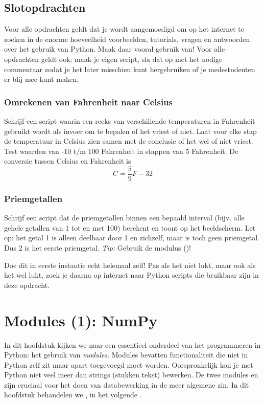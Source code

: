 \documentclass[a4paper,11pt, fleqn]{article}
\newcommand{\ditwc}{Naam van het huidige werkcollege}
\begin{document}
\subsection{Slotopdrachten}
Voor alle opdrachten geldt dat je wordt aangemoedigd om op het internet te zoeken in de enorme hoeveelheid voorbeelden, tutorials, vragen en antwoorden over het gebruik van Python. Maak daar vooral gebruik van! Voor alle opdrachten geldt ook: maak je eigen script, sla dat op met het nodige commentaar zodat je het later misschien kunt hergebruiken of je medestudenten er blij mee kunt maken.

\subsubsection{Omrekenen van Fahrenheit naar Celsius}
Schrijf een script waarin een reeks van verschillende temperaturen in Fahrenheit gebruikt wordt als invoer om te bepalen of het vriest of niet. Laat voor elke stap de temperatuur in Celsius zien samen met de conclusie of het wel of niet vriest. Test waarden van -10 t/m 100 Fahrenheit in stappen van 5 Fahrenheit. De conversie tussen Celsius en Fahrenheit is
\begin{equation}
C = \frac{5}{9}F - 32
\end{equation}

\subsubsection{Priemgetallen}
Schrijf een script dat de priemgetallen binnen een bepaald interval (bijv. alle gehele getallen van 1 tot en met 100) berekent en toont op het beeldscherm. Let op: het getal 1 is alleen deelbaar door 1 en zichzelf, maar is toch geen priemgetal. Dus 2 is het eerste priemgetal. \textit{Tip:} Gebruik de modulus (\pythoninline{\%})!

Doe dit in eerste instantie echt helemaal zelf! Pas als het niet lukt, maar ook als het wel lukt, zoek je daarna op internet naar Python scripts die bruikbaar zijn in deze opdracht. 

\clearpage
\renewcommand{\ditwc}{Modules (1): NumPy}
\section[Modules (1): NumPy]{\ditwc}
In dit hoofdstuk kijken we naar een essentieel onderdeel van het programmeren in Python: het gebruik van {\it modules}. Modules bevatten functionaliteit die niet in Python zelf zit maar apart toegevoegd moet worden. Oorspronkelijk kon je met Python niet veel meer dan strings (stukken tekst) bewerken. De twee modules  en  zijn cruciaal voor het doen van databewerking in de meer algemene zin. In dit hoofdstuk behandelen we , in het volgende .
\end{document}
